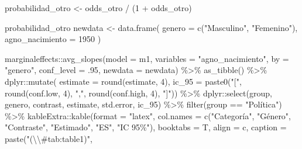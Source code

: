 \documentclass[
  12pt,
  a4paper,
]{article}
\newenvironment{Shaded}{\begin{snugshade}}{\end{snugshade}}
\newcommand{\AttributeTok}[1]{\textcolor[rgb]{0.77,0.63,0.00}{#1}}
\newcommand{\DecValTok}[1]{\textcolor[rgb]{0.00,0.00,0.81}{#1}}
\newcommand{\FunctionTok}[1]{\textcolor[rgb]{0.00,0.00,0.00}{#1}}
\newcommand{\NormalTok}[1]{#1}
\newcommand{\OtherTok}[1]{\textcolor[rgb]{0.56,0.35,0.01}{#1}}
\newcommand{\SpecialCharTok}[1]{\textcolor[rgb]{0.00,0.00,0.00}{#1}}
\newcommand{\StringTok}[1]{\textcolor[rgb]{0.31,0.60,0.02}{#1}}
\begin{document}
\begin{Shaded}
\begin{Highlighting}[]
\NormalTok{probabilidad\_otro }\OtherTok{\textless{}{-}}\NormalTok{ odds\_otro }\SpecialCharTok{/}\NormalTok{ (}\DecValTok{1} \SpecialCharTok{+}\NormalTok{ odds\_otro)}

\NormalTok{probabilidad\_otro}
\NormalTok{newdata }\OtherTok{\textless{}{-}} \FunctionTok{data.frame}\NormalTok{(}
  \AttributeTok{genero =} \FunctionTok{c}\NormalTok{(}\StringTok{"Masculino"}\NormalTok{, }\StringTok{"Femenino"}\NormalTok{),}
  \AttributeTok{agno\_nacimiento =} \DecValTok{1950}
\NormalTok{)}

\NormalTok{marginaleffects}\SpecialCharTok{::}\FunctionTok{avg\_slopes}\NormalTok{(}\AttributeTok{model =}\NormalTok{ m1, }
                            \AttributeTok{variables =} \StringTok{"agno\_nacimiento"}\NormalTok{,}
                            \AttributeTok{by =} \StringTok{"genero"}\NormalTok{,}
                            \AttributeTok{conf\_level =}\NormalTok{ .}\DecValTok{95}\NormalTok{,}
                            \AttributeTok{newdata =}\NormalTok{ newdata) }\SpecialCharTok{\%\textgreater{}\%} 
  \FunctionTok{as\_tibble}\NormalTok{() }\SpecialCharTok{\%\textgreater{}\%} 
\NormalTok{  dplyr}\SpecialCharTok{::}\FunctionTok{mutate}\NormalTok{(}
    \AttributeTok{estimate =} \FunctionTok{round}\NormalTok{(estimate, }\DecValTok{4}\NormalTok{),}
    \AttributeTok{ic\_95 =} \FunctionTok{paste0}\NormalTok{(}\StringTok{"["}\NormalTok{, }\FunctionTok{round}\NormalTok{(conf.low, }\DecValTok{4}\NormalTok{), }\StringTok{","}\NormalTok{, }
                   \FunctionTok{round}\NormalTok{(conf.high, }\DecValTok{4}\NormalTok{), }\StringTok{"]"}\NormalTok{)) }\SpecialCharTok{\%\textgreater{}\%} 
\NormalTok{  dplyr}\SpecialCharTok{::}\FunctionTok{select}\NormalTok{(group, genero, contrast, estimate, std.error, ic\_95) }\SpecialCharTok{\%\textgreater{}\%}
  \FunctionTok{filter}\NormalTok{(group }\SpecialCharTok{==} \StringTok{"Política"}\NormalTok{) }\SpecialCharTok{\%\textgreater{}\%} 
\NormalTok{  kableExtra}\SpecialCharTok{::}\FunctionTok{kable}\NormalTok{(}\AttributeTok{format =} \StringTok{"latex"}\NormalTok{, }
                    \AttributeTok{col.names =} \FunctionTok{c}\NormalTok{(}\StringTok{"Categoría"}\NormalTok{, }\StringTok{"Género"}\NormalTok{, }\StringTok{"Contraste"}\NormalTok{, }
                                  \StringTok{"Estimado"}\NormalTok{, }\StringTok{"ES"}\NormalTok{, }\StringTok{"IC 95\%"}\NormalTok{),}
                    \AttributeTok{booktabs =}\NormalTok{ T, }
                    \AttributeTok{align =} \StringTok{\textquotesingle{}c\textquotesingle{}}\NormalTok{,}
                    \AttributeTok{caption =} \FunctionTok{paste}\NormalTok{(}\StringTok{"(}\SpecialCharTok{\textbackslash{}\textbackslash{}}\StringTok{\#tab:table1)"}\NormalTok{,}

\end{Highlighting}
\end{Shaded}
\end{document}
